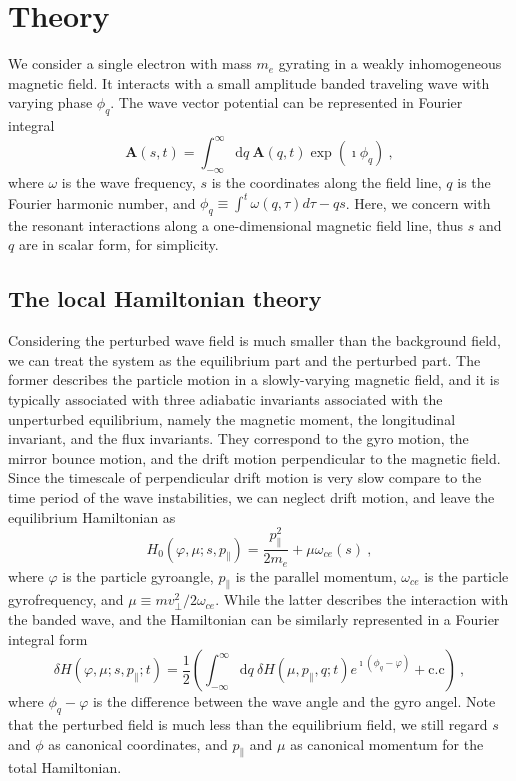 \section{Theory}
\label{sec:theory}
We consider a single electron with mass $m_e$ gyrating in a weakly inhomogeneous magnetic field.
It interacts with a small amplitude banded traveling wave with varying phase $\phi_q$.
The wave vector potential can be represented in Fourier integral
\begin{equation}\label{eq.def_A}
    \mathbf{A}(s,t) =  \int_{-\infty}^{\infty}\mathrm{d} q~ \mathbf{A}\left(q,t\right) \exp(\imath\phi_{q})~,
\end{equation}
where $\omega$ is the wave frequency, $s$ is the coordinates along the field line, $q$ is the Fourier harmonic number, and $\phi_q \equiv \int^t \omega(q, \tau)d\tau - q s$.
Here, we concern with the resonant interactions along a one-dimensional magnetic field line, thus $s$ and $q$ are in scalar form, for simplicity.
\subsection{The local Hamiltonian theory}
Considering the perturbed wave field is much smaller than the background field, we can treat the system as the equilibrium part and the perturbed part.
The former describes the particle motion in a slowly-varying magnetic field, and it is typically associated with three adiabatic invariants associated with the unperturbed equilibrium, namely the magnetic moment, the longitudinal invariant, and the flux invariants.
They correspond to the gyro motion, the mirror bounce motion, and the drift motion perpendicular to the magnetic field.
Since the timescale of perpendicular drift motion is very slow compare to the time period of the wave instabilities, we can neglect drift motion, and leave the equilibrium Hamiltonian as
\begin{equation}
    H_0(\varphi,\mu;s,p_\|) =  \frac{p_\|^2}{2 m_e} + \mu \omega_{ce}(s)~,
\end{equation}
where $\varphi$ is the particle gyroangle, $p_\|$ is the parallel momentum, $\omega_{ce}$ is the particle gyrofrequency, and $\mu \equiv m v_\perp^2/2 \omega_{ce}$.
While the latter describes the interaction with the banded wave, and the Hamiltonian can be similarly represented in a Fourier integral form
\begin{equation}\label{eq.def_H}
    \delta H(\varphi,\mu; s,p_\|;t) = \frac{1}{2}\left(\int_{-\infty}^{\infty} \mathrm{d} q~{\delta H}\left(\mu, p_\|, q ; t\right) e^{\imath\left(\phi_{q}-\varphi\right)}+ \mathrm{c.c}\right)~,
\end{equation}
where $\phi_q - \varphi$ is the difference between the wave angle and the gyro angel.
Note that the perturbed field is much less than the equilibrium field, we still regard $s$ and $\phi$ as canonical coordinates, and $p_\parallel$ and $\mu$ as canonical momentum for the total Hamiltonian.

